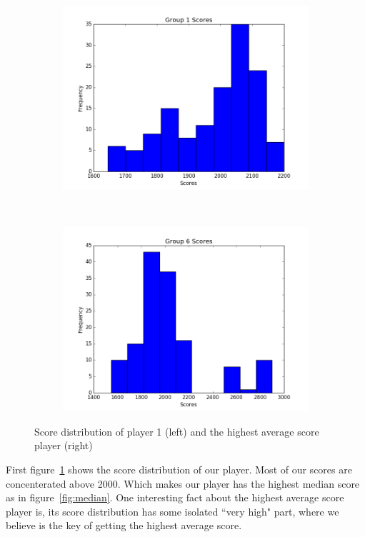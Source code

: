 \begin{figure}[ht]
\centering
\begin{subfigure}[t]{.45\textwidth}
\centering
\includegraphics[width=\textwidth]{Histograms/g1.png}
\end{subfigure}
~
\begin{subfigure}[t]{.45\textwidth}
\centering
\includegraphics[width=\textwidth]{Histograms/g6.png}
\end{subfigure}
\caption{Score distribution of player 1 (left) and the highest average score player (right)}\label{fig:scores}
\end{figure}

First figure~\ref{fig:scores} shows the score distribution of our player. Most of our scores are concenterated above
2000. Which makes our player has the highest median score as in figure~\ref{fig:median}. 
One interesting fact about the highest average score player is, its score distribution has some isolated
``very high" part, where we believe is the key of getting the highest average score.

